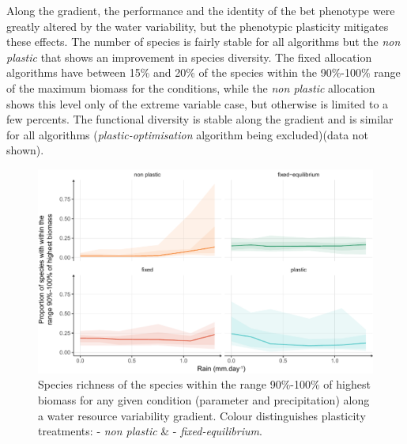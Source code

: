 

Along the gradient, the performance and the identity of the bet phenotype were greatly altered by the water variability, but the phenotypic plasticity mitigates these effects. The number of species is fairly stable for all algorithms but the \textit{non plastic} that shows an improvement in species diversity. The fixed allocation algorithms have between 15\% and 20\% of the species within the 90\%-100\% range of the maximum biomass for the conditions, while the \textit{non plastic} allocation shows this level only of the extreme variable case, but otherwise is limited to a few percents. The functional diversity is stable along the gradient and is similar for all algorithms (\textit{plastic-optimisation} algorithm being excluded)(data not shown).

\begin{figure}
\includegraphics[width = \textwidth]{./2_PP/Figures/Variable/var_spdiv_trend.pdf}
\caption[Species richness of the best performing species along a water resource variability gradient]{Species richness of the species within the range 90\%-100\% of highest biomass for any given condition (parameter and precipitation) along a water resource variability gradient.  Colour distinguishes plasticity treatments: \textcolor{myOrange}{- \textit{non plastic}} \&  \textcolor{myGreen}{- \textit{fixed-equilibrium}}.}\label{fig:variable}
\end{figure}

